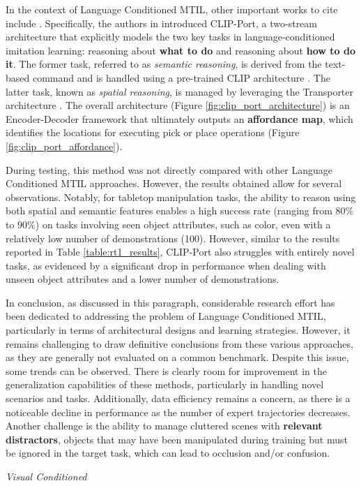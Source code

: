 In the context of Language Conditioned MTIL, other important works to cite include \cite{shridhar2022cliport, shridhar2023perceiver}. Specifically, the authors in \cite{shridhar2022cliport} introduced CLIP-Port, a two-stream architecture that explicitly models the two key tasks in language-conditioned imitation learning: reasoning about \textbf{what to do} and reasoning about \textbf{how to do it}. The former task, referred to as \textit{semantic reasoning}, is derived from the text-based command and is handled using a pre-trained CLIP architecture \cite{radford2021learning}. The latter task, known as \textit{spatial reasoning}, is managed by leveraging the Transporter architecture \cite{zeng2021transporter}. The overall architecture (Figure \ref{fig:clip_port_architecture}) is an Encoder-Decoder framework that ultimately outputs an \textbf{affordance map}, which identifies the locations for executing pick or place operations (Figure \ref{fig:clip_port_affordance}).

During testing, this method was not directly compared with other Language Conditioned MTIL approaches. However, the results obtained allow for several observations. Notably, for tabletop manipulation tasks, the ability to reason using both spatial and semantic features enables a high success rate (ranging from $80\%$ to $90\%$) on tasks involving seen object attributes, such as color, even with a relatively low number of demonstrations (100). However, similar to the results reported in Table \ref{table:rt1_results}, CLIP-Port also struggles with entirely novel tasks, as evidenced by a significant drop in performance when dealing with unseen object attributes and a lower number of demonstrations.



In conclusion, as discussed in this paragraph, considerable research effort has been dedicated to addressing the problem of Language Conditioned MTIL, particularly in terms of architectural designs and learning strategies. However, it remains challenging to draw definitive conclusions from these various approaches, as they are generally not evaluated on a common benchmark. Despite this issue, some trends can be observed. There is clearly room for improvement in the generalization capabilities of these methods, particularly in handling novel scenarios and tasks. Additionally, data efficiency remains a concern, as there is a noticeable decline in performance as the number of expert trajectories decreases. Another challenge is the ability to manage cluttered scenes with \textbf{relevant distractors}, objects that may have been manipulated during training but must be ignored in the target task, which can lead to occlusion and/or confusion.

\textit{Visual Conditioned}